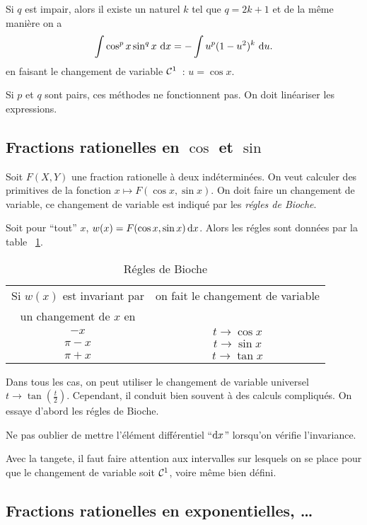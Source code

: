 Si \(q\) est impair, alors il existe un naturel \(k\) tel que \(q=2k+1\) et de la même manière on a
\begin{equation}
  \int \cos^p x \sin^q x\,\mathop{}\mathopen{}\mathrm{d} x = -\int u^p(1-u^2)^k \,\mathop{}\mathopen{}\mathrm{d} u.
\end{equation}
en faisant le changement de variable \(\mathcal{C}^{1}\)~: \(u=\cos x\).

Si \(p\) et \(q\) sont pairs, ces méthodes ne fonctionnent pas. On doit linéariser les expressions.

\subsection{Fractions rationelles en \(\cos\) et \(\sin\)}

Soit \(F(X,Y)\) une fraction rationelle à deux indéterminées. On veut calculer des primitives de la fonction \(x \longmapsto F(\cos x,\sin x)\). On doit faire un changement de variable, ce changement de variable est indiqué par les \emph{régles de Bioche}.

Soit pour ``tout'' \(x\), \(w(x)=F(\cos x,\sin x)\mathop{}\mathopen{}\mathrm{d} x\). Alors les régles sont données par la table~
\ref{tab:bioche}.
\begin{table}[!h]
  \centering
  \begin{tabular}{|c|c|}\hline
    Si \(w(x)\) est invariant par & on fait le changement de variable \\
    un changement de \(x\) en &  \\ \hline
    \(-x\) & \(t \to \cos x\)\\
    \(\pi-x\) & \(t \to \sin x\)\\
    \(\pi+x\) & \(t \to \tan x\)\\
  \hline\end{tabular}
  \caption{Régles de Bioche}
  \label{tab:bioche}
\end{table}

Dans tous les cas, on peut utiliser le changement de variable universel \(t \to \tan\left(\frac{t}{2}\right)\). Cependant, il conduit bien souvent à des calculs compliqués. On essaye d'abord les régles de Bioche.

\danger Ne pas oublier de mettre l'élément différentiel ``\(\mathop{}\mathopen{}\mathrm{d} x\)'' lorsqu'on vérifie l'invariance.

\danger Avec la tangete, il faut faire attention aux intervalles sur lesquels on se place pour que le changement de variable soit \(\mathcal{C}^{1}\), voire même bien défini.

\subsection{Fractions rationelles en exponentielles, \ldots}

